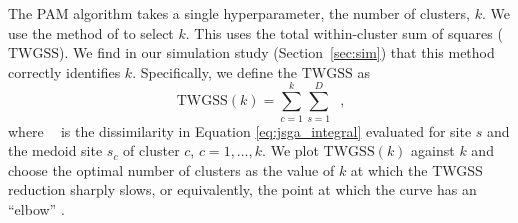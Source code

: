 \documentclass[12pt]{article}
\newcommand{\JSGa}{\mathop{\mathrm{JS}^{\mathrm{G}_{\lambda}}}\nolimits}
\newcommand{\eJSGa}[1]{\mathop{\mathrm{eJS}_{i, #1}^{\mathrm{G}_{\lambda}}}\nolimits}
\begin{document}
The PAM algorithm takes a single hyperparameter, the number of clusters, $k$.
We use the method of \citet{Thorndike1953-ie} to select $k$.
This uses the total within-cluster sum of squares ($\mathrm{TWGSS}$).
We find in our simulation study (Section~\ref{sec:sim}) that this method correctly identifies $k$. 
Specifically, we define the $\mathrm{TWGSS}$ as
\begin{equation}~\label{eq:twgss}
  \mathrm{TWGSS}(k) = \sum_{c=1}^{k} \sum_{s =1}^{D} \eJSGa{s, s_c},
\end{equation}
where $\eJSGa{s, s_c}$ is the dissimilarity in Equation \eqref{eq:jsga_integral} evaluated for 
site $s$ and the medoid site $s_c$ of cluster $c$, $c = 1, \ldots, k$. 
We plot $\mathrm{TWGSS}(k)$ against $k$ and choose the optimal number of clusters as the value of $k$ at which the TWGSS reduction sharply slows, or equivalently, the point at which the curve has an ``elbow'' \citet{Hastie2009}. 
\end{document}
